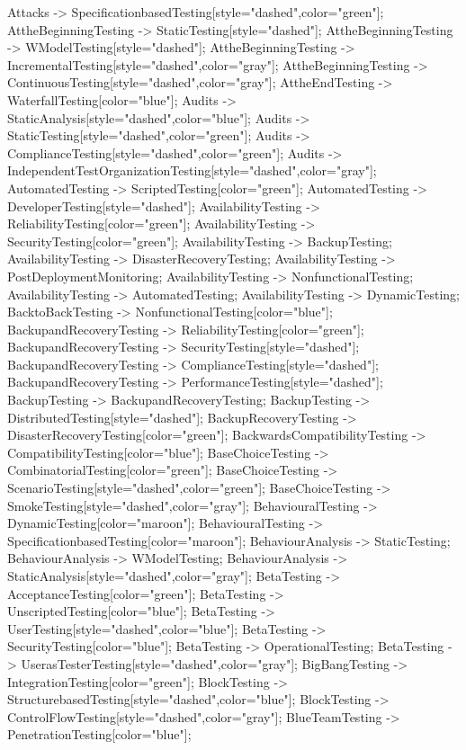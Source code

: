 \documentclass{article}
\begin{document}
{Attacks -> SpecificationbasedTesting[style="dashed",color="green"];
AttheBeginningTesting -> StaticTesting[style="dashed"];
AttheBeginningTesting -> WModelTesting[style="dashed"];
AttheBeginningTesting -> IncrementalTesting[style="dashed",color="gray"];
AttheBeginningTesting -> ContinuousTesting[style="dashed",color="gray"];
AttheEndTesting -> WaterfallTesting[color="blue"];
Audits -> StaticAnalysis[style="dashed",color="blue"];
Audits -> StaticTesting[style="dashed",color="green"];
Audits -> ComplianceTesting[style="dashed",color="green"];
Audits -> IndependentTestOrganizationTesting[style="dashed",color="gray"];
AutomatedTesting -> ScriptedTesting[color="green"];
AutomatedTesting -> DeveloperTesting[style="dashed"];
AvailabilityTesting -> ReliabilityTesting[color="green"];
AvailabilityTesting -> SecurityTesting[color="green"];
AvailabilityTesting -> BackupTesting;
AvailabilityTesting -> DisasterRecoveryTesting;
AvailabilityTesting -> PostDeploymentMonitoring;
AvailabilityTesting -> NonfunctionalTesting;
AvailabilityTesting -> AutomatedTesting;
AvailabilityTesting -> DynamicTesting;
BacktoBackTesting -> NonfunctionalTesting[color="blue"];
BackupandRecoveryTesting -> ReliabilityTesting[color="green"];
BackupandRecoveryTesting -> SecurityTesting[style="dashed"];
BackupandRecoveryTesting -> ComplianceTesting[style="dashed"];
BackupandRecoveryTesting -> PerformanceTesting[style="dashed"];
BackupTesting -> BackupandRecoveryTesting;
BackupTesting -> DistributedTesting[style="dashed"];
BackupRecoveryTesting -> DisasterRecoveryTesting[color="green"];
BackwardsCompatibilityTesting -> CompatibilityTesting[color="blue"];
BaseChoiceTesting -> CombinatorialTesting[color="green"];
BaseChoiceTesting -> ScenarioTesting[style="dashed",color="green"];
BaseChoiceTesting -> SmokeTesting[style="dashed",color="gray"];
BehaviouralTesting -> DynamicTesting[color="maroon"];
BehaviouralTesting -> SpecificationbasedTesting[color="maroon"];
BehaviourAnalysis -> StaticTesting;
BehaviourAnalysis -> WModelTesting;
BehaviourAnalysis -> StaticAnalysis[style="dashed",color="gray"];
BetaTesting -> AcceptanceTesting[color="green"];
BetaTesting -> UnscriptedTesting[color="blue"];
BetaTesting -> UserTesting[style="dashed",color="blue"];
BetaTesting -> SecurityTesting[color="blue"];
BetaTesting -> OperationalTesting;
BetaTesting -> UserasTesterTesting[style="dashed",color="gray"];
BigBangTesting -> IntegrationTesting[color="green"];
BlockTesting -> StructurebasedTesting[style="dashed",color="blue"];
BlockTesting -> ControlFlowTesting[style="dashed",color="gray"];
BlueTeamTesting -> PenetrationTesting[color="blue"];
}
\end{document}
